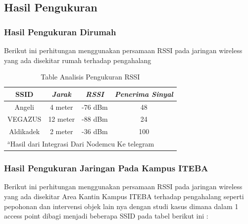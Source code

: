 \documentclass[conference]{IEEEtran}
\begin{document}
\vspace{8cm}

\subsection{Hasil Pengukuran}
\subsubsection{Hasil Pengukuran Dirumah}
Berikut ini perhitungan menggunakan persamaan RSSI 
pada jaringan wireless yang ada disekitar rumah terhadap pengahalang

    \begin{table}[htbp]
    \caption{Table Analisis Pengukuran RSSI}
    \begin{center}
    \begin{tabular}{|c|c|c|c|}
        \hline
    \textbf{SSID} & \textbf{\textit{Jarak}}& \textbf{\textit{RSSI}}& \textbf{\textit{Penerima Sinyal}} \\
    \hline
    Angeli & 4 meter& -76 dBm & 48  \\
    \hline
    VEGAZUS & 12 meter& -88 dBm & 24  \\
    \hline
    Aldikadek & 2 meter& -36 dBm & 100   \\
    \hline
    \multicolumn{4}{l}{$^{\mathrm{a}}$Hasil dari Integrasi Dari Nodemcu Ke telegram}
    \end{tabular}
    \label{tab1}
    \end{center}
    \end{table}

    \subsubsection{Hasil Pengukuran Jaringan Pada Kampus ITEBA}
    Berikut ini perhitungan menggunakan persamaan RSSI 
pada jaringan wireless yang ada disekitar Area Kantin Kampus ITEBA 
 terhadap pengahalang seperti pepohonan dan intervensi objek lain nya dengan studi kasus dimana dalam 1 access
 point dibagi menjadi beberapa SSID pada tabel berikut ini : 
\end{document}
